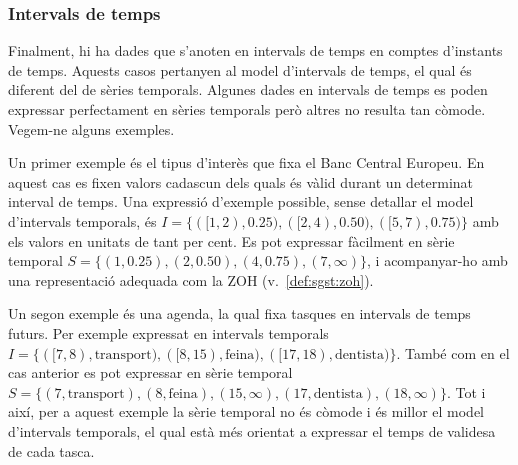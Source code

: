 \subsubsection{Intervals de temps}

Finalment, hi ha dades que s'anoten en intervals de temps en comptes
d'instants de temps. Aquests casos pertanyen al model d'intervals de
temps, el qual és diferent del de sèries temporals. Algunes dades en
intervals de temps es poden expressar perfectament en sèries temporals
però altres no resulta tan còmode. Vegem-ne alguns exemples.


Un primer exemple és el tipus d'interès que fixa el Banc Central
Europeu. En aquest cas es fixen valors cadascun dels quals és vàlid
durant un determinat interval de temps. Una expressió d'exemple
possible, sense detallar el model d'intervals temporals, és
$I=\{([1,2),0.25),([2,4),0.50),([5,7),0.75)\}$ amb els valors en
unitats de tant per cent. Es pot expressar fàcilment en sèrie temporal
$S=\{(1,0.25),(2,0.50),(4,0.75),(7,\infty)\}$, i acompanyar-ho amb una
representació adequada com la ZOH (v.~\autoref{def:sgst:zoh}).


Un segon exemple és una agenda, la qual fixa tasques en intervals de
temps futurs. Per exemple expressat en intervals temporals
$I=\{([7,8),\text{transport}),([8,15),\text{feina}),([17,18),
\text{dentista})\}$. També com en el cas anterior es pot expressar en
sèrie temporal $S=\{(7,\text{transport}),(8,\text{feina}), (15,\infty)
,(17,\text{dentista}), (18,\infty)\}$. Tot i així, per a aquest
exemple la sèrie temporal no és còmode i és millor el model
d'intervals temporals, el qual està més orientat a expressar
el temps de validesa de cada tasca.







